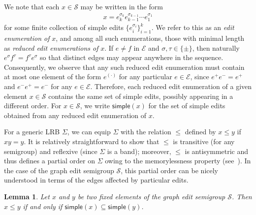 \documentclass[11pt,a4paper]{article}
\newcommand{\simple}[1]{\mathrm{\mathsf{simple}}({#1})}
\newtheorem{lemma}[theorem]{Lemma}
\begin{document}
We note that each $x\in \mathcal{S}$ may be written in the form
    \begin{align*}
        x = e_k^{\sigma_k} e_{k-1}^{\sigma_{k-1}} \cdots e_{1}^{\sigma_1}
    \end{align*}
for some finite collection of simple edits $\{e_i^{\sigma_i}\}_{i=1}^k$. We refer to this as an \textit{edit enumeration of} $x$, and among all such enumerations, those with minimal length as \textit{reduced edit enumerations of} $x$. If $e\neq f$ in ${\mathcal{E}}$ and $\sigma,\tau\in\{\pm\}$, then naturally $e^\sigma f^\tau = f^\tau e^\sigma$ so that distinct edges may appear anywhere in the sequence. Consequently, we observe that any such reduced edit enumeration must contain at most one element of the form $e^{(\cdot)}$ for any particular $e\in {\mathcal{E}}$, since ${e^+}{e^-} = {e^+}$ and ${e^-}{e^+} = {e^-}$ for any $e\in\mathcal{E}$. Therefore, each reduced edit enumeration of a given element $x\in \mathcal{S}$ contains the same set of simple edits, possibly appearing in a different order. For $x\in\mathcal{S}$, we write $\simple{x}$ for the set of simple edits obtained from any reduced edit enumeration of $x$.

For a generic LRB $\Sigma$, we can equip $\Sigma$ with the relation $\leqslant$ defined by $x\leqslant y$ if $xy = y$. It is relatively straightforward to show that $\leqslant$ is transitive (for any semigroup) and reflexive (since $\Sigma$ is a band); moreover, $\leqslant$ is antisymmetric and thus defines a partial order on $\Sigma$ owing to the memorylessness property (see~\cite[Proposition 7]{brownSemigroupsRingsMarkov2000}). In the case of the graph edit semigroup $\mathcal{S}$, this partial order can be nicely understood in terms of the edges affected by particular edits. 

\begin{lemma}\label{lem:right-dominance-char}
    Let $x$ and $y$ be two fixed elements of the graph edit semigroup $\mathcal{S}$. Then $x\leqslant y$ if and only if $\simple{x}\subseteq\simple{y}$.
\end{lemma}
\end{document}
